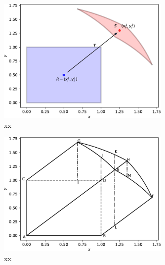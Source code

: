 \documentclass{article}
\theoremstyle{theorem}
\theoremstyle{definition}
\begin{document}
\begin{figure}[htb]
\centering
\includegraphics[width=0.75\textwidth]{sphere_regions.pdf}
\caption{xx}
\label{fig:sphere_regions}
\end{figure}

\begin{figure}[htb]
\centering
\includegraphics[width=0.75\textwidth]{sphere_xy.pdf}
\caption{xx}
\label{fig:prismatoid_solid}
\end{figure}




\end{document}
